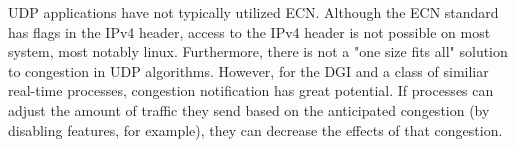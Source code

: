 UDP applications have not typically utilized ECN.
Although the ECN standard has flags in the IPv4 header, access to the IPv4 header is not possible on most system, most notably linux.
Furthermore, there is not a "one size fits all" solution to congestion in UDP algorithms.
However, for the DGI and a class of similiar real-time processes, congestion notification has great potential.
If processes can adjust the amount of traffic they send based on the anticipated congestion (by disabling features, for example), they can decrease the effects of that congestion.

